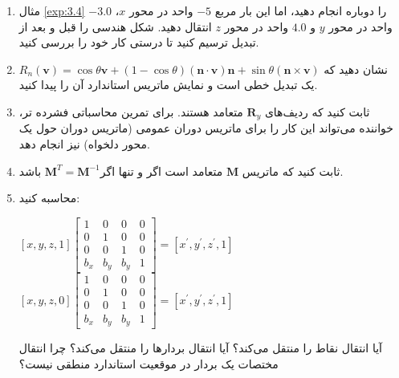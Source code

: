 {\begin{spacing}{1.5}
\begin{enumerate}[label=\textbf{\arabic*}.]
            \item {مثال \ref{exp:3.4} را دوباره انجام دهید، اما این بار مربع $-5$ واحد در محور $x$، $-3.0$ واحد در محور $y$ و $4.0$ واحد در محور $z$ انتقال دهید.
            شکل هندسی را قبل و بعد از تبدیل ترسیم کنید تا درستی کار خود را بررسی کنید.}

            \item {نشان دهید که $R_{n}(\textbf{v})=\cos\theta\textbf{v}+(1-\cos\theta)(\textbf{n}\cdot\textbf{v})\textbf{n}+\sin\theta(\textbf{n}\times\textbf{v})$ یک تبدیل خطی است و نمایش ماتریس استاندارد آن را پیدا کنید.}

            \item {ثابت کنید که ردیف‌های $\textbf{R}_{y}$ متعامد هستند. برای تمرین محاسباتی فشرده تر، خواننده می‌تواند این کار را برای ماتریس دوران عمومی (ماتریس دوران حول یک محور دلخواه) نیز انجام دهد.}

            \item {ثابت کنید که ماتریس $\textbf{M}$ متعامد است اگر و تنها اگر$\textbf{M}^{T}=\textbf{M}^{-1}$ باشد.}

            \item { محاسبه کنید:
                \begin{center}
                    $[x, y, z, 1]\begin{bmatrix}
                                     1     & 0     & 0     & 0 \\
                                     0     & 1     & 0     & 0 \\
                                     0     & 0     & 1     & 0 \\
                                     b_{x} & b_{y} & b_{y} & 1
                    \end{bmatrix}=[x^\prime, y^\prime, z^\prime,1]$ \hspace{5 mm}
                    $[x, y, z, 0]\begin{bmatrix}
                                     1     & 0     & 0     & 0 \\
                                     0     & 1     & 0     & 0 \\
                                     0     & 0     & 1     & 0 \\
                                     b_{x} & b_{y} & b_{y} & 1
                    \end{bmatrix}=[x^\prime, y^\prime, z^\prime,1]$
                \end{center}
                آیا انتقال نقاط را منتقل می‌کند؟ آیا انتقال بردارها را منتقل می‌کند؟ چرا انتقال مختصات یک بردار در موقعیت استاندارد منطقی نیست؟
            }


\end{enumerate}
\end{spacing}}
